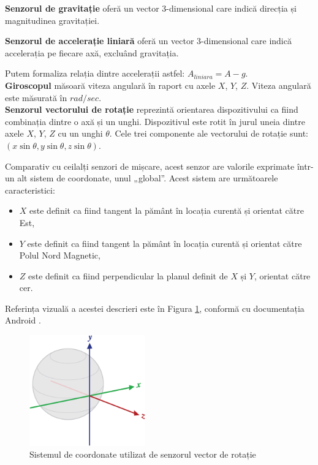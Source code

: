 \documentclass[12pt,a4paper]{article}
\begin{document}
	\textbf{Senzorul de gravitație} oferă un vector 3-dimensional care indică direcția și magnitudinea gravitației.

	\textbf{Senzorul de accelerație liniară} oferă un vector 3-dimensional care indică accelerația pe fiecare axă, excluând gravitația.

	Putem formaliza relația dintre accelerații astfel:
	$A_{liniara} = A - g$.\\

	\textbf{Giroscopul} măsoară viteza angulară în raport cu axele $X$, $Y$, $Z$. Viteza angulară este măsurată în $rad/sec$.\\

	\textbf{Senzorul vectorului de rotație} reprezintă orientarea dispozitivului ca fiind combinația dintre o axă și un unghi. Dispozitivul este rotit în jurul uneia dintre axele $X$, $Y$, $Z$ cu un unghi $\theta$. Cele trei componente ale vectorului de rotație sunt: $(x \sin{\theta}, y \sin{\theta}, z \sin{\theta})$. 
	
	Comparativ cu ceilalți senzori de mișcare, acest senzor are valorile exprimate într-un alt sistem de coordonate, unul „global”.
	Acest sistem are următoarele caracteristici:
	\begin{itemize}
	\item $X$ este definit ca fiind tangent la pământ în locația curentă și orientat către Est,
	\item $Y$ este definit ca fiind tangent la pământ în locația curentă și orientat către Polul Nord Magnetic,
	\item $Z$ este definit ca fiind perpendicular la planul definit de $X$ și $Y$, orientat către cer.
	\end{itemize}
	
	Referința vizuală a acestei descrieri este în Figura \ref{fig:axis_globe}, conformă cu documentația Android \cite{DeveloperAndroid}.

\begin{figure}[h]
\centering
\includegraphics[width=5cm]{figures/axis_globe.png}
\caption{Sistemul de coordonate utilizat de senzorul vector de rotație}
\label{fig:axis_globe}
\end{figure}
\end{document}
